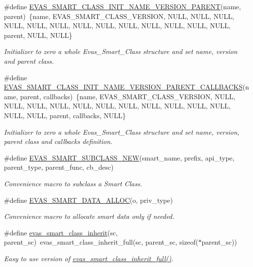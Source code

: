 \begin{DoxyCompactItemize}
\#define \hyperlink{group__Evas__Smart__Group_ga653b7bf36c2c87bd38d8126e11a4671d}{EVAS\_\-SMART\_\-CLASS\_\-INIT\_\-NAME\_\-VERSION\_\-PARENT}(name, parent)~\{name, EVAS\_\-SMART\_\-CLASS\_\-VERSION, NULL, NULL, NULL, NULL, NULL, NULL, NULL, NULL, NULL, NULL, NULL, NULL, NULL, parent, NULL, NULL\}
\begin{DoxyCompactList}\small\item\em Initializer to zero a whole Evas\_\-Smart\_\-Class structure and set name, version and parent class. \item\end{DoxyCompactList}\item 
\#define \hyperlink{group__Evas__Smart__Group_ga5ebe1775142621cc3b75a3c57085ec83}{EVAS\_\-SMART\_\-CLASS\_\-INIT\_\-NAME\_\-VERSION\_\-PARENT\_\-CALLBACKS}(name, parent, callbacks)~\{name, EVAS\_\-SMART\_\-CLASS\_\-VERSION, NULL, NULL, NULL, NULL, NULL, NULL, NULL, NULL, NULL, NULL, NULL, NULL, NULL, parent, callbacks, NULL\}
\begin{DoxyCompactList}\small\item\em Initializer to zero a whole Evas\_\-Smart\_\-Class structure and set name, version, parent class and callbacks definition. \item\end{DoxyCompactList}\item 
\#define \hyperlink{group__Evas__Smart__Group_ga58dc94af6f064b39b2bf0155908fbe52}{EVAS\_\-SMART\_\-SUBCLASS\_\-NEW}(smart\_\-name, prefix, api\_\-type, parent\_\-type, parent\_\-func, cb\_\-desc)
\begin{DoxyCompactList}\small\item\em Convenience macro to subclass a Smart Class. \item\end{DoxyCompactList}\item 
\#define \hyperlink{group__Evas__Smart__Group_ga4aa4b72aafa0391144fb0171aeff2ccd}{EVAS\_\-SMART\_\-DATA\_\-ALLOC}(o, priv\_\-type)
\begin{DoxyCompactList}\small\item\em Convenience macro to allocate smart data only if needed. \item\end{DoxyCompactList}\item 
\#define \hyperlink{group__Evas__Smart__Group_ga6888875280ccf11f026e09c890650c95}{evas\_\-smart\_\-class\_\-inherit}(sc, parent\_\-sc)~evas\_\-smart\_\-class\_\-inherit\_\-full(sc, parent\_\-sc, sizeof($\ast$parent\_\-sc))
\begin{DoxyCompactList}\small\item\em Easy to use version of \hyperlink{group__Evas__Smart__Group_ga21f5af32f724500c3380906d166fc49f}{evas\_\-smart\_\-class\_\-inherit\_\-full()}. \item\end{DoxyCompactList}\end{DoxyCompactItemize}
